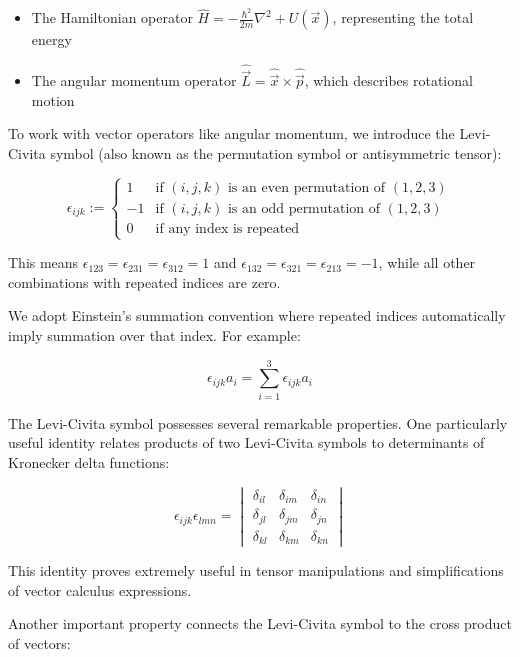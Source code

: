 \documentclass[italian]{HKNdocument}
\begin{document}
\begin{itemize}
  \item The Hamiltonian operator $\hat{H}=-\frac{\hbar^{2}}{2 m} \nabla^{2}+U(\vec{x})$, representing the total energy
  \item The angular momentum operator $\hat{\vec{L}}=\hat{\vec{x}} \times \hat{\vec{p}}$, which describes rotational motion
\end{itemize}

To work with vector operators like angular momentum, we introduce the Levi-Civita symbol (also known as the permutation symbol or antisymmetric tensor):

\[
\epsilon_{i j k}:= \begin{cases}
1 & \text{if $(i,j,k)$ is an even permutation of $(1,2,3)$} \\
-1 & \text{if $(i,j,k)$ is an odd permutation of $(1,2,3)$} \\
0 & \text{if any index is repeated}
\end{cases}
\]

This means $\epsilon_{123} = \epsilon_{231} = \epsilon_{312} = 1$ and $\epsilon_{132} = \epsilon_{321} = \epsilon_{213} = -1$, while all other combinations with repeated indices are zero.

We adopt Einstein's summation convention where repeated indices automatically imply summation over that index. For example:

\begin{equation}
\epsilon_{i j k} a_{i}=\sum_{i=1}^3 \epsilon_{i j k} a_{i}
\end{equation}

The Levi-Civita symbol possesses several remarkable properties. One particularly useful identity relates products of two Levi-Civita symbols to determinants of Kronecker delta functions:

\[
\epsilon_{i j k} \epsilon_{l m n}=\begin{vmatrix}
\delta_{i l} & \delta_{i m} & \delta_{i n} \\
\delta_{j l} & \delta_{j m} & \delta_{j n} \\
\delta_{k l} & \delta_{k m} & \delta_{k n}
\end{vmatrix}
\]

This identity proves extremely useful in tensor manipulations and simplifications of vector calculus expressions.

Another important property connects the Levi-Civita symbol to the cross product of vectors:
\end{document}
